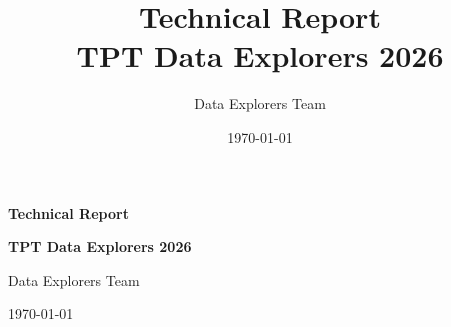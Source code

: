 \documentclass[12pt,a4paper]{article}
\title{Technical Report \\ \large TPT Data Explorers 2026}
\author{Data Explorers Team}
\date{\today}
\begin{document}
\begin{titlepage}
    \centering
    \vspace*{2in}
    {\Huge \bfseries Technical Report \par}
    \vspace{0.5in}
    {\Large \bfseries TPT Data Explorers 2026 \par}
    \vspace{1.5in}
    {\large Data Explorers Team \par}
    \vspace{0.5in}
    {\large \today \par}
    \vfill
\end{titlepage}

\newpage


\newpage
\tableofcontents
\newpage













\end{document}
